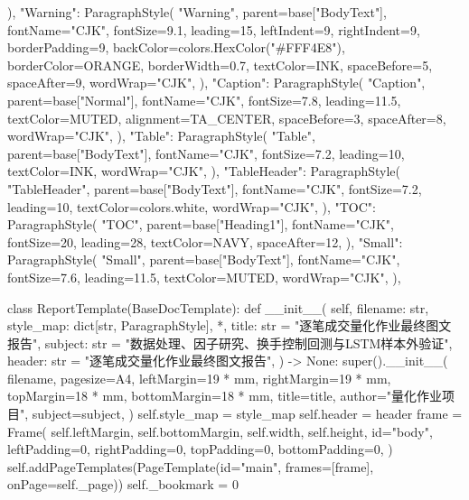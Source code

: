 \documentclass[UTF8,a4paper,fontset=fandol]{ctexart}
\begin{document}
\begin{ProjectCode}
{{        ),
        "Warning": ParagraphStyle(
            "Warning",
            parent=base["BodyText"],
            fontName="CJK",
            fontSize=9.1,
            leading=15,
            leftIndent=9,
            rightIndent=9,
            borderPadding=9,
            backColor=colors.HexColor("#FFF4E8"),
            borderColor=ORANGE,
            borderWidth=0.7,
            textColor=INK,
            spaceBefore=5,
            spaceAfter=9,
            wordWrap="CJK",
        ),
        "Caption": ParagraphStyle(
            "Caption",
            parent=base["Normal"],
            fontName="CJK",
            fontSize=7.8,
            leading=11.5,
            textColor=MUTED,
            alignment=TA_CENTER,
            spaceBefore=3,
            spaceAfter=8,
            wordWrap="CJK",
        ),
        "Table": ParagraphStyle(
            "Table",
            parent=base["BodyText"],
            fontName="CJK",
            fontSize=7.2,
            leading=10,
            textColor=INK,
            wordWrap="CJK",
        ),
        "TableHeader": ParagraphStyle(
            "TableHeader",
            parent=base["BodyText"],
            fontName="CJK",
            fontSize=7.2,
            leading=10,
            textColor=colors.white,
            wordWrap="CJK",
        ),
        "TOC": ParagraphStyle(
            "TOC",
            parent=base["Heading1"],
            fontName="CJK",
            fontSize=20,
            leading=28,
            textColor=NAVY,
            spaceAfter=12,
        ),
        "Small": ParagraphStyle(
            "Small",
            parent=base["BodyText"],
            fontName="CJK",
            fontSize=7.6,
            leading=11.5,
            textColor=MUTED,
            wordWrap="CJK",
        ),
    }


class ReportTemplate(BaseDocTemplate):
    def __init__(
        self,
        filename: str,
        style_map: dict[str, ParagraphStyle],
        *,
        title: str = "逐笔成交量化作业最终图文报告",
        subject: str = "数据处理、因子研究、换手控制回测与LSTM样本外验证",
        header: str = "逐笔成交量化作业最终图文报告",
    ) -> None:
        super().__init__(
            filename,
            pagesize=A4,
            leftMargin=19 * mm,
            rightMargin=19 * mm,
            topMargin=18 * mm,
            bottomMargin=18 * mm,
            title=title,
            author="量化作业项目",
            subject=subject,
        )
        self.style_map = style_map
        self.header = header
        frame = Frame(
            self.leftMargin,
            self.bottomMargin,
            self.width,
            self.height,
            id="body",
            leftPadding=0,
            rightPadding=0,
            topPadding=0,
            bottomPadding=0,
        )
        self.addPageTemplates(PageTemplate(id="main", frames=[frame], onPage=self._page))
        self._bookmark = 0

}
\end{ProjectCode}
\end{document}
